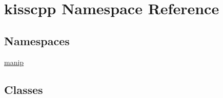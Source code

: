 \hypertarget{namespacekisscpp}{\section{kisscpp Namespace Reference}
\label{namespacekisscpp}
}
\subsection*{Namespaces}
\begin{DoxyCompactItemize}
\item 
\hyperlink{namespacekisscpp_1_1manip}{manip}
\end{DoxyCompactItemize}
\subsection*{Classes}
